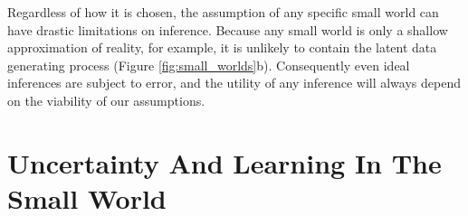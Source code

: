 Regardless of how it is chosen, the assumption of any specific 
small world can have drastic limitations on inference.  Because any
small world is only a shallow approximation of reality, for example, 
it is unlikely to contain the latent data generating process (Figure
\ref{fig:small_worlds}b).  Consequently even ideal inferences are 
subject to error, and the utility of any inference will always depend 
on the viability of our assumptions.

\begin{figure*}
\centering
%
\caption{Practical inference requires the selection of a distinguished subset 
of data generating processes called a small world, $\mathcal{S}$, that (a) 
may or (b) may not contain the latent data generating process, $\pi_{D}$.  
The Boxian philosophy of ``all models are wrong but some are useful'' 
asserts that the former is impossible in practical problems, but even in 
the latter case the probability distributions in the small world may provide 
useful approximations of $\pi_{D}$.
}
\label{fig:small_worlds}
\end{figure*}

\section{Uncertainty And Learning In The Small World}

